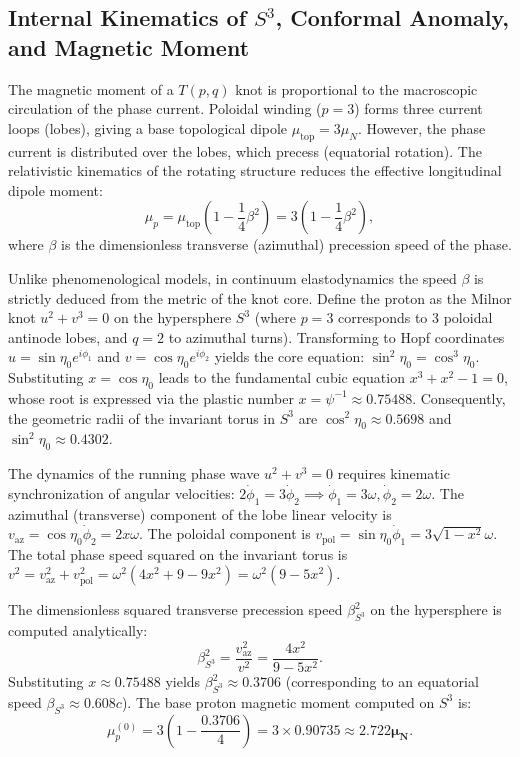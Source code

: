 \documentclass[11pt,a4paper]{article}
\begin{document}
\subsection{Internal Kinematics of $S^3$, Conformal Anomaly, and Magnetic Moment}
The magnetic moment of a $T(p,q)$ knot is proportional to the macroscopic circulation of the phase current. Poloidal winding ($p=3$) forms three current loops (lobes), giving a base topological dipole $\mu_{\text{top}} = 3 \mu_N$. However, the phase current is distributed over the lobes, which precess (equatorial rotation). The relativistic kinematics of the rotating structure reduces the effective longitudinal dipole moment:
\begin{equation}
\mu_p = \mu_{\text{top}} \left(1 - \frac{1}{4}\beta^2\right) = 3 \left(1 - \frac{1}{4}\beta^2\right),
\end{equation}
where $\beta$ is the dimensionless transverse (azimuthal) precession speed of the phase.

Unlike phenomenological models, in continuum elastodynamics the speed $\beta$ is strictly deduced from the metric of the knot core. Define the proton as the Milnor knot $u^2 + v^3 = 0$ on the hypersphere $S^3$ (where $p=3$ corresponds to 3 poloidal antinode lobes, and $q=2$ to azimuthal turns).
Transforming to Hopf coordinates $u = \sin\eta_0 e^{i\phi_1}$ and $v = \cos\eta_0 e^{i\phi_2}$ yields the core equation: $\sin^2\eta_0 = \cos^3\eta_0$. Substituting $x = \cos\eta_0$ leads to the fundamental cubic equation $x^3 + x^2 - 1 = 0$, whose root is expressed via the plastic number $x = \psi^{-1} \approx 0.75488$. Consequently, the geometric radii of the invariant torus in $S^3$ are $\cos^2\eta_0 \approx 0.5698$ and $\sin^2\eta_0 \approx 0.4302$.

The dynamics of the running phase wave $u^2 + v^3 = 0$ requires kinematic synchronization of angular velocities: $2\dot{\phi}_1 = 3\dot{\phi}_2 \implies \dot{\phi}_1 = 3\omega, \dot{\phi}_2 = 2\omega$.
The azimuthal (transverse) component of the lobe linear velocity is $v_{\text{az}} = \cos\eta_0 \dot{\phi}_2 = 2x\omega$.
The poloidal component is $v_{\text{pol}} = \sin\eta_0 \dot{\phi}_1 = 3\sqrt{1-x^2}\omega$.
The total phase speed squared on the invariant torus is $v^2 = v_{\text{az}}^2 + v_{\text{pol}}^2 = \omega^2 (4x^2 + 9 - 9x^2) = \omega^2 (9 - 5x^2)$.

The dimensionless squared transverse precession speed $\beta_{S^3}^2$ on the hypersphere is computed analytically:
\begin{equation}
\beta_{S^3}^2 = \frac{v_{\text{az}}^2}{v^2} = \frac{4x^2}{9 - 5x^2}.
\end{equation}
Substituting $x \approx 0.75488$ yields $\beta_{S^3}^2 \approx 0.3706$ (corresponding to an equatorial speed $\beta_{S^3} \approx 0.608 c$).
The base proton magnetic moment computed on $S^3$ is:
\begin{equation}
\mu_p^{(0)} = 3 \left(1 - \frac{0.3706}{4}\right) = 3 \times 0.90735 \approx \mathbf{2.722 \mu_N}.
\end{equation}
\end{document}
